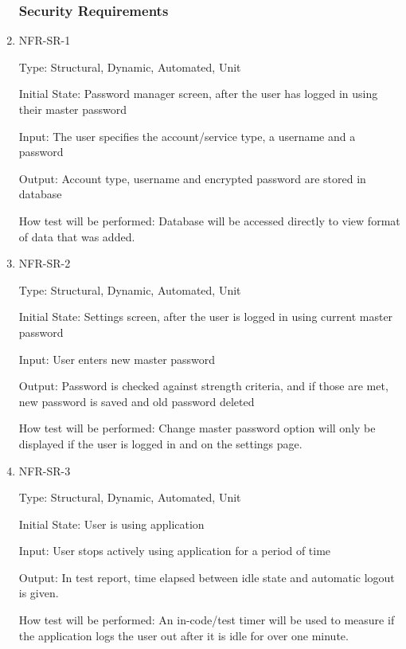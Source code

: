 \documentclass[12pt, titlepage]{article}
\begin{document}
\begin{enumerate}
\subsubsection{Security Requirements}

\item{NFR-SR-1\\}

Type: Structural, Dynamic, Automated, Unit

Initial State: Password manager screen, after the user has logged in using their master password

Input: The user specifies the account/service type, a username and a password

Output: Account type, username and encrypted password are stored in database

How test will be performed: Database will be accessed directly to view format of data that was added.
 
\item{NFR-SR-2}

Type: Structural, Dynamic, Automated, Unit

Initial State: Settings screen, after the user is logged in using current master password

Input: User enters new master password

Output: Password is checked against strength criteria, and if those are met, new password is saved and old password deleted

How test will be performed: Change master password option will only be displayed if the user is logged in and on the settings page.

\item{NFR-SR-3}

Type: Structural, Dynamic, Automated, Unit

Initial State: User is using application

Input: User stops actively using application for a period of time

Output: In test report, time elapsed between idle state and automatic logout is given.

How test will be performed: An in-code/test timer will be used to measure if the application logs the user out after it is idle for over one minute.

\end{enumerate}
\end{document}
